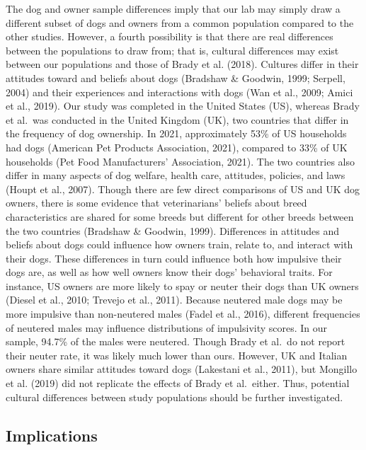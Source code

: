 \documentclass[
  pub,floatsintext]{apa6}
\begin{document}
The dog and owner sample differences imply that our lab may simply draw a different subset of dogs and owners from a common population compared to the other studies. However, a fourth possibility is that there are real differences between the populations to draw from; that is, cultural differences may exist between our populations and those of Brady et al. (2018). Cultures differ in their attitudes toward and beliefs about dogs (Bradshaw \& Goodwin, 1999; Serpell, 2004) and their experiences and interactions with dogs (Wan et al., 2009; Amici et al., 2019). Our study was completed in the United States (US), whereas Brady et al.~was conducted in the United Kingdom (UK), two countries that differ in the frequency of dog ownership. In 2021, approximately 53\% of US households had dogs (American Pet Products Association, 2021), compared to 33\% of UK households (Pet Food Manufacturers' Association, 2021). The two countries also differ in many aspects of dog welfare, health care, attitudes, policies, and laws (Houpt et al., 2007). Though there are few direct comparisons of US and UK dog owners, there is some evidence that veterinarians' beliefs about breed characteristics are shared for some breeds but different for other breeds between the two countries (Bradshaw \& Goodwin, 1999). Differences in attitudes and beliefs about dogs could influence how owners train, relate to, and interact with their dogs. These differences in turn could influence both how impulsive their dogs are, as well as how well owners know their dogs' behavioral traits. For instance, US owners are more likely to spay or neuter their dogs than UK owners (Diesel et al., 2010; Trevejo et al., 2011). Because neutered male dogs may be more impulsive than non-neutered males (Fadel et al., 2016), different frequencies of neutered males may influence distributions of impulsivity scores. In our sample, 94.7\% of the males were neutered. Though Brady et al.~do not report their neuter rate, it was likely much lower than ours. However, UK and Italian owners share similar attitudes toward dogs (Lakestani et al., 2011), but Mongillo et al. (2019) did not replicate the effects of Brady et al.~either. Thus, potential cultural differences between study populations should be further investigated.

\hypertarget{implications}{%
\subsection{Implications}\label{implications}}
\end{document}
